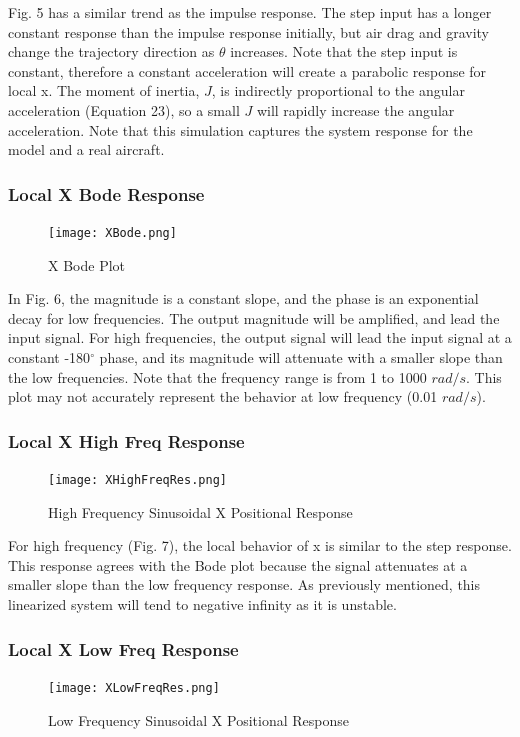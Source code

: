 \documentclass[conference]{IEEEtran}
\begin{document}
Fig. 5 has a similar trend as the impulse response. The step input has a longer constant response than the impulse response initially, but air drag and gravity change the trajectory direction as $\theta$ increases. Note that the step input is constant, therefore a constant acceleration will create a parabolic response for local x. The moment of inertia, $J$, is indirectly proportional to the angular acceleration (Equation 23), so a small $J$ will rapidly increase the angular acceleration. Note that this simulation captures the system response for the model and a real aircraft.  

\subsubsection{Local X Bode Response} 
\begin{figure}[htbp]
\centerline{\texttt{[image: XBode.png]}}
\caption{X Bode Plot}
\label{figure}
\end{figure}

In Fig. 6, the magnitude is a constant slope, and the phase is an exponential decay for low frequencies. The output magnitude will be amplified, and lead the input signal. For high frequencies, the output signal will lead the input signal at a constant -180$^{\circ}$ phase, and its magnitude will attenuate with a smaller slope than the low frequencies. Note that the frequency range is from 1 to 1000 $rad/s$. This plot may not accurately represent the behavior at low frequency (0.01 $rad/s$).


\newpage
\subsubsection{Local X High Freq Response}
\begin{figure}[htbp]
\centering
\centerline{\texttt{[image: XHighFreqRes.png]}}
\caption{High Frequency Sinusoidal X  Positional Response}
\label{figure}
\end{figure}

For high frequency (Fig. 7), the local behavior of x is similar to the step response. This response agrees with the Bode plot because the signal attenuates at a smaller slope than the low frequency response. As previously mentioned, this linearized system will tend to negative infinity as it is unstable. \\

\subsubsection{Local X Low Freq Response} 
\begin{figure}[htbp]
\centerline{\texttt{[image: XLowFreqRes.png]}}
\caption{Low Frequency Sinusoidal X Positional Response}
\label{figure}
\end{figure}
\end{document}
